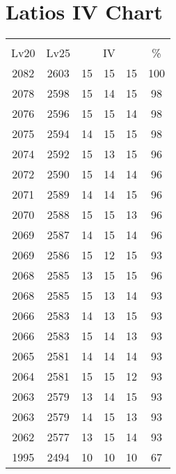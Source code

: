 \documentclass{article}%
\begin{document}
%
\normalsize%
\section{Latios IV Chart}%
\label{sec:Latios IV Chart}%
\renewcommand{\arraystretch}{1.5}%
\begin{tabular}{|c|c|c|c|c|c|}%
\hline%
\multicolumn{6}{|c|}{\textcolor{white}{ 
\linebreak{Latios}
}%
\cellcolor{black}}\\%
\multicolumn{1}{|c}{Lv20}&\multicolumn{1}{c|}{Lv25}&\multicolumn{3}{c|}{IV}&\multicolumn{1}{|c|}{\%}\\%
\hline%
\rowcolor{color100}%
2082&2603&15&15&15&100\\%
\hline%
\rowcolor{color98}%
2078&2598&15&14&15&98\\%
\hline%
\rowcolor{color98}%
2076&2596&15&15&14&98\\%
\hline%
\rowcolor{color98}%
2075&2594&14&15&15&98\\%
\hline%
\rowcolor{color96}%
2074&2592&15&13&15&96\\%
\hline%
\rowcolor{color96}%
2072&2590&15&14&14&96\\%
\hline%
\rowcolor{color96}%
2071&2589&14&14&15&96\\%
\hline%
\rowcolor{color96}%
2070&2588&15&15&13&96\\%
\hline%
\rowcolor{color96}%
2069&2587&14&15&14&96\\%
\hline%
\rowcolor{color93}%
2069&2586&15&12&15&93\\%
\hline%
\rowcolor{color96}%
2068&2585&13&15&15&96\\%
\hline%
\rowcolor{color93}%
2068&2585&15&13&14&93\\%
\hline%
\rowcolor{color93}%
2066&2583&14&13&15&93\\%
\hline%
\rowcolor{color93}%
2066&2583&15&14&13&93\\%
\hline%
\rowcolor{color93}%
2065&2581&14&14&14&93\\%
\hline%
\rowcolor{color93}%
2064&2581&15&15&12&93\\%
\hline%
\rowcolor{color93}%
2063&2579&13&14&15&93\\%
\hline%
\rowcolor{color93}%
2063&2579&14&15&13&93\\%
\hline%
\rowcolor{color93}%
2062&2577&13&15&14&93\\%
\hline%
\rowcolor{color91}%
1995&2494&10&10&10&67\\%
\end{tabular}

%
\end{document}
